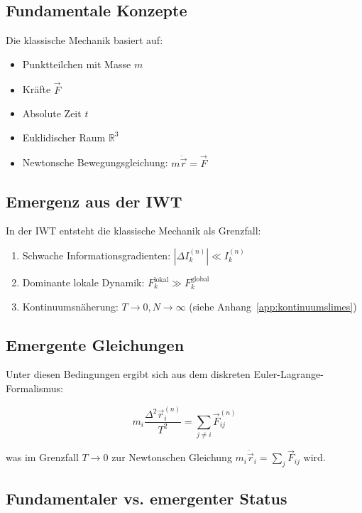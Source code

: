 \subsection{Fundamentale Konzepte}
\label{sub:vergleich_klassisch_konzepte}

Die klassische Mechanik basiert auf:

\begin{itemize}
    \item Punktteilchen mit Masse \( m \)
    \item Kräfte \( \vec{F} \)
    \item Absolute Zeit \( t \)
    \item Euklidischer Raum \( \mathbb{R}^3 \)
    \item Newtonsche Bewegungsgleichung: \( m\ddot{\vec{r}} = \vec{F} \)
\end{itemize}

\subsection{Emergenz aus der IWT}
\label{sub:vergleich_klassisch_emergenz}

In der IWT entsteht die klassische Mechanik als Grenzfall:

\begin{enumerate}
    \item Schwache Informationsgradienten: \( |\Delta I_k^{(n)}| \ll I_k^{(n)} \)
    \item Dominante lokale Dynamik: \( F_k^{\text{lokal}} \gg F_k^{\text{global}} \)
    \item Kontinuumsnäherung: \( T \to 0, N \to \infty \) (siehe Anhang~\ref{app:kontinuumslimes})
\end{enumerate}

\subsection{Emergente Gleichungen}
\label{sub:vergleich_klassisch_gleichungen}

Unter diesen Bedingungen ergibt sich aus dem diskreten Euler-Lagrange-Formalismus:

\[
m_i \frac{\Delta^2 \vec{r}_i^{(n)}}{T^2} = \sum_{j \neq i} \vec{F}_{ij}^{(n)}
\]

was im Grenzfall \( T \to 0 \) zur Newtonschen Gleichung \( m_i \ddot{\vec{r}}_i = \sum_j \vec{F}_{ij} \) wird.

\subsection{Fundamentaler vs. emergenter Status}
\label{sub:vergleich_klassisch_status}

